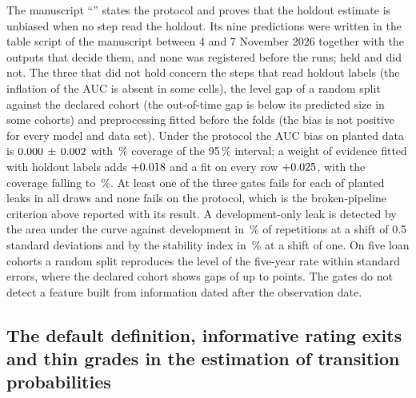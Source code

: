 The manuscript ``\pxPaperTitleThree{}'' states the protocol and proves that the holdout estimate is unbiased when no step read the holdout. Its
nine predictions were written in the table script of the manuscript between 4 and 7 November 2026 together with the outputs that decide them, and none was
registered before the runs; \pxPpThreeHeld{} held and \pxPpThreeNotHeld{} did not. The three that did not hold concern the steps that read holdout labels (the
inflation of the AUC is absent in some cells), the level gap of a random split against the declared cohort (the out-of-time gap is below its predicted size in
some cohorts) and preprocessing fitted before the folds (the bias is not positive for every model and data set). Under the protocol the AUC bias on planted data
is $0.000\,\pm\,0.002$ with \pxPpThreeNoneCov\,\% coverage of the 95\,\% interval; a weight of evidence fitted with holdout labels adds
$+0.018$ and a fit on every row $+0.025$, with the coverage falling to \pxPpThreeFitCov\,\%. At least one of the three gates fails for each of
\pxPpThreeLeaks{} planted leaks in all \pxPpThreeDraws{} draws and none fails on the protocol, which is the broken-pipeline criterion above reported with its result.
A development-only leak is detected by the area under the curve against development in \pxPpThreeAucDev{}\,\% of repetitions at a shift of 0.5 standard
deviations and by the stability index in \pxPpThreeCsiDev{}\,\% at a shift of one. On five loan cohorts a random split reproduces the level of the five-year rate
within \pxPpThreeMaxZ{} standard errors, where the declared cohort shows gaps of up to \pxPpThreeOotGap{} points. The gates do not detect a feature built from
information dated after the observation date.

\subsection{The default definition, informative rating exits and thin grades in the estimation of transition probabilities}
\label{sec:bs4}


